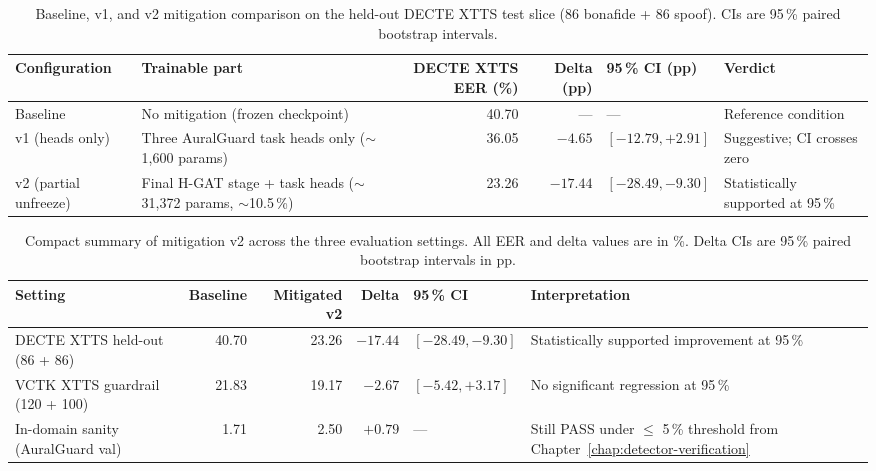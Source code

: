 \begin{table}[t]
\centering
\caption{Baseline, v1, and v2 mitigation comparison on the held-out DECTE XTTS test slice (86 bonafide + 86 spoof). CIs are 95\,\% paired bootstrap intervals.}
\label{tab:mitigation-v1-v2-comparison}
\scriptsize
\setlength{\tabcolsep}{3pt}
\begin{tabularx}{\linewidth}{@{}l X r r l X@{}}
\toprule
\textbf{Configuration} & \textbf{Trainable part} & \textbf{DECTE XTTS EER (\%)} & \textbf{Delta (pp)} & \textbf{95\,\% CI (pp)} & \textbf{Verdict} \\
\midrule
Baseline               & No mitigation (frozen checkpoint) & 40.70 & ---              & ---                          & Reference condition \\
v1 (heads only)        & Three AuralGuard task heads only ($\sim$1{,}600 params) & 36.05 & $-4.65$          & $[-12.79, +2.91]$            & Suggestive; CI crosses zero \\
v2 (partial unfreeze)  & Final H-GAT stage + task heads ($\sim$31{,}372 params, $\sim$10.5\,\%) & 23.26 & $\mathbf{-17.44}$ & $\mathbf{[-28.49, -9.30]}$   & Statistically supported at 95\,\% \\
\bottomrule
\end{tabularx}
\end{table}

\begin{table}[t]
\centering
\caption{Compact summary of mitigation v2 across the three evaluation settings. All EER and delta values are in \%. Delta CIs are 95\,\% paired bootstrap intervals in pp.}
\label{tab:mitigation-summary}
\scriptsize
\setlength{\tabcolsep}{3pt}
\begin{tabularx}{\linewidth}{@{}X r r r l X@{}}
\toprule
\textbf{Setting} & \textbf{Baseline} & \textbf{Mitigated v2} & \textbf{Delta} & \textbf{95\,\% CI} & \textbf{Interpretation} \\
\midrule
DECTE XTTS held-out (86 + 86) & 40.70 & 23.26 & $\mathbf{-17.44}$ & $\mathbf{[-28.49, -9.30]}$ & Statistically supported improvement at 95\,\% \\
VCTK XTTS guardrail (120 + 100) & 21.83 & 19.17 & $-2.67$ & $[-5.42, +3.17]$ & No significant regression at 95\,\% \\
In-domain sanity (AuralGuard val) & 1.71 & 2.50 & $+0.79$ & --- & Still PASS under $\leq$ 5\,\% threshold from Chapter~\ref{chap:detector-verification} \\
\bottomrule
\end{tabularx}
\end{table}

